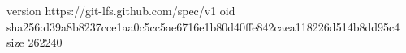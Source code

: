 version https://git-lfs.github.com/spec/v1
oid sha256:d39a8b8237cce1aa0c5cc5ae6716e1b80d40ffe842caea118226d514b8dd95c4
size 262240
